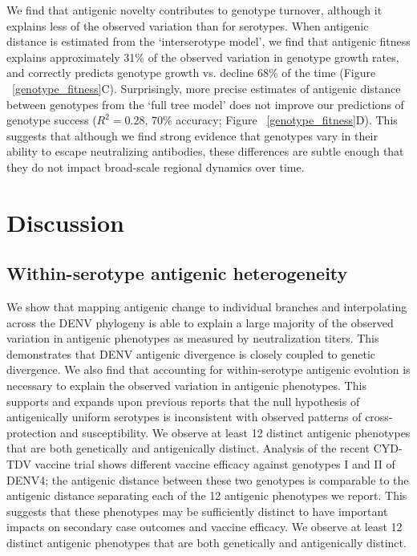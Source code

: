 \documentclass[11pt,oneside,letterpaper]{article}
\begin{document}
We find that antigenic novelty contributes to genotype turnover, although it explains less of the observed variation than for serotypes.
When antigenic distance is estimated from the `interserotype model', we find that antigenic fitness explains approximately 31\% of the observed variation in genotype growth rates, and correctly predicts genotype growth vs. decline 68\% of the time (Figure ~\ref{genotype_fitness}C).
Surprisingly, more precise estimates of antigenic distance between genotypes from the `full tree model' does not improve our predictions of genotype success ($R^2 = 0.28$, 70\% accuracy; Figure ~\ref{genotype_fitness}D).
This suggests that although we find strong evidence that genotypes vary in their ability to escape neutralizing antibodies, these differences are subtle enough that they do not impact broad-scale regional dynamics over time.

\section*{Discussion}

\subsection*{Within-serotype antigenic heterogeneity}
We show that mapping antigenic change to individual branches and interpolating across the DENV phylogeny is able to explain a large majority of the observed variation in antigenic phenotypes as measured by neutralization titers.
This demonstrates that DENV antigenic divergence is closely coupled to genetic divergence.
We also find that accounting for within-serotype antigenic evolution is necessary to explain the observed variation in antigenic phenotypes.
This supports and expands upon previous reports that the null hypothesis of antigenically uniform serotypes is inconsistent with observed patterns of cross-protection and susceptibility.
We observe at least 12 distinct antigenic phenotypes that are both genetically and antigenically distinct.
Analysis of the recent CYD-TDV vaccine trial shows different vaccine efficacy against genotypes I and II of DENV4; the antigenic distance between these two genotypes is comparable to the antigenic distance separating each of the 12 antigenic phenotypes we report.
This suggests that these phenotypes may be sufficiently distinct to have important impacts on secondary case outcomes and vaccine efficacy.
We observe at least 12 distinct antigenic phenotypes that are both genetically and antigenically distinct.
\end{document}
